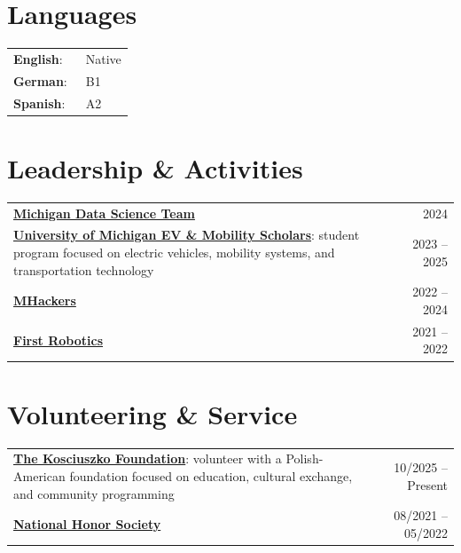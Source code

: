 \documentclass[letterpaper,11pt]{article}
\begin{document}
\section{Languages}
    \begin{itemize}[leftmargin=0.15in, label={}]
        \small{
            \item{
                \begin{tabular}{@{}l l@{}}
                    \textbf{English}: & \ Native \\
                    \textbf{German}: & \ B1 \\
                    \textbf{Spanish}: & \ A2 \\
                \end{tabular}
            }
        }
    \end{itemize}

\section{Leadership \& Activities}
    \small {
        \begin{tabularx}{\textwidth}{@{}X@{\hspace{0.12in}}r@{}}
            \textbf{\href{https://mdst.club}{Michigan Data Science Team}} & 2024 \\
            \textbf{\href{https://mcity.umich.edu/what-mcity-offers/for-students/michigander-scholars-program/}{University of Michigan EV \& Mobility Scholars}}: student program focused on electric vehicles, mobility systems, and transportation technology & 2023 -- 2025 \\
            \textbf{\href{https://michhackers.com}{MHackers}} & 2022 -- 2024 \\
            \textbf{\href{https://www.firstinspires.org}{First Robotics}} & 2021 -- 2022 \\
        \end{tabularx}
    }

\section{Volunteering \& Service}
    \small {
        \begin{tabularx}{\textwidth}{@{}X r@{}}
            \textbf{\href{https://thekf.org}{The Kosciuszko Foundation}}: volunteer with a Polish-American foundation focused on education, cultural exchange, and community programming & 10/2025 -- Present \\
            \textbf{\href{https://www.nationalhonorsociety.org}{National Honor Society}} & 08/2021 -- 05/2022 \\
        \end{tabularx}
    }
\end{document}
